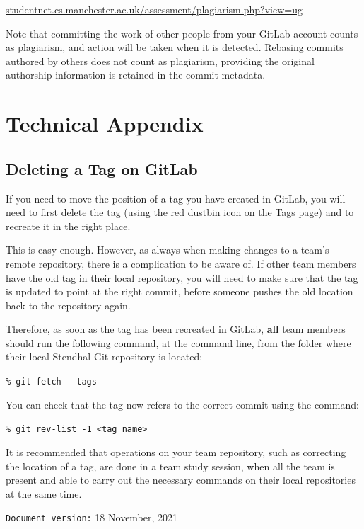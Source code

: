 \documentclass[
]{book}
\begin{document}
\href{http://studentnet.cs.manchester.ac.uk/assessment/plagiarism.php?view=ug}{studentnet.cs.manchester.ac.uk/assessment/plagiarism.php?view=ug}

Note that committing the work of other people from your GitLab account counts as plagiarism, and action will be taken when it is detected. Rebasing commits authored by others does not count as plagiarism, providing the original authorship information is retained in the commit metadata.

\hypertarget{technical-appendix}{%
\section{Technical Appendix}\label{technical-appendix}}

\hypertarget{delab}{%
\subsection{Deleting a Tag on GitLab}\label{delab}}

If you need to move the position of a tag you have created in GitLab, you will need to first delete the tag (using the red dustbin icon on the Tags page) and to recreate it in the right place.

This is easy enough. However, as always when making changes to a team's remote repository, there is a complication to be aware of. If other team members have the old tag in their local repository, you will need to make sure that the tag is updated to point at the right commit, before someone pushes the old location back to the repository again.

Therefore, as soon as the tag has been recreated in GitLab, \textbf{all} team members should run the following command, at the command line, from the folder where their local Stendhal Git repository is located:

\texttt{\%\ git\ fetch\ -\/-tags}

You can check that the tag now refers to the correct commit using the command:

\texttt{\%\ git\ rev-list\ -1\ \textless{}tag\ name\textgreater{}}

It is recommended that operations on your team repository, such as correcting the location of a tag, are done in a team study session, when all the team is present and able to carry out the necessary commands on their local repositories at the same time.

\texttt{Document\ version:} 18 November, 2021
\end{document}
